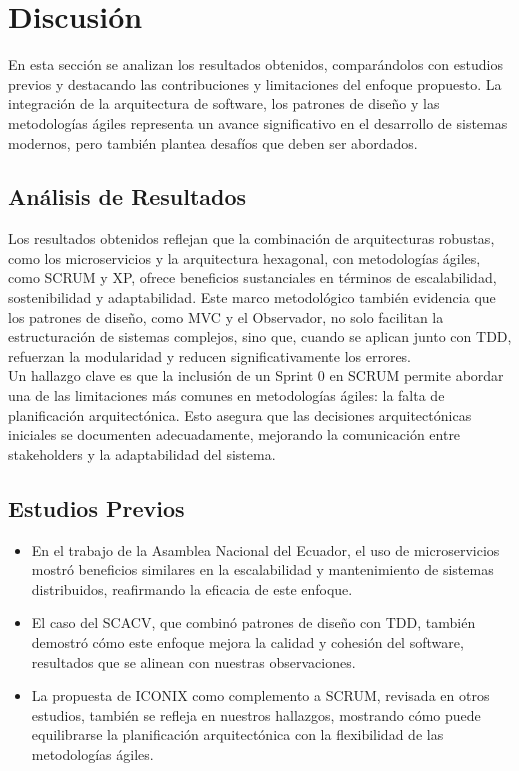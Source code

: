\documentclass[conference]{IEEEtran}
\begin{document}
\section{Discusión}
En esta sección se analizan los resultados obtenidos, comparándolos con estudios previos y destacando las contribuciones y limitaciones del enfoque propuesto. La integración de la arquitectura de software, los patrones de diseño y las metodologías ágiles representa un avance significativo en el desarrollo de sistemas modernos, pero también plantea desafíos que deben ser abordados.\\

\subsection{Análisis de Resultados}
Los resultados obtenidos reflejan que la combinación de arquitecturas robustas, como los microservicios y la arquitectura hexagonal, con metodologías ágiles, como SCRUM y XP, ofrece beneficios sustanciales en términos de escalabilidad, sostenibilidad y adaptabilidad. Este marco metodológico también evidencia que los patrones de diseño, como MVC y el Observador, no solo facilitan la estructuración de sistemas complejos, sino que, cuando se aplican junto con TDD, refuerzan la modularidad y reducen significativamente los errores.\\

Un hallazgo clave es que la inclusión de un Sprint 0 en SCRUM permite abordar una de las limitaciones más comunes en metodologías ágiles: la falta de planificación arquitectónica. Esto asegura que las decisiones arquitectónicas iniciales se documenten adecuadamente, mejorando la comunicación entre stakeholders y la adaptabilidad del sistema.

\subsection{Estudios Previos}
\begin{itemize}
    \item En el trabajo de la Asamblea Nacional del Ecuador, el uso de microservicios mostró beneficios similares en la escalabilidad y mantenimiento de sistemas distribuidos, reafirmando la eficacia de este enfoque.
    \item El caso del SCACV, que combinó patrones de diseño con TDD, también demostró cómo este enfoque mejora la calidad y cohesión del software, resultados que se alinean con nuestras observaciones.
    \item La propuesta de ICONIX como complemento a SCRUM, revisada en otros estudios, también se refleja en nuestros hallazgos, mostrando cómo puede equilibrarse la planificación arquitectónica con la flexibilidad de las metodologías ágiles.\\
\end{itemize}
\end{document}
